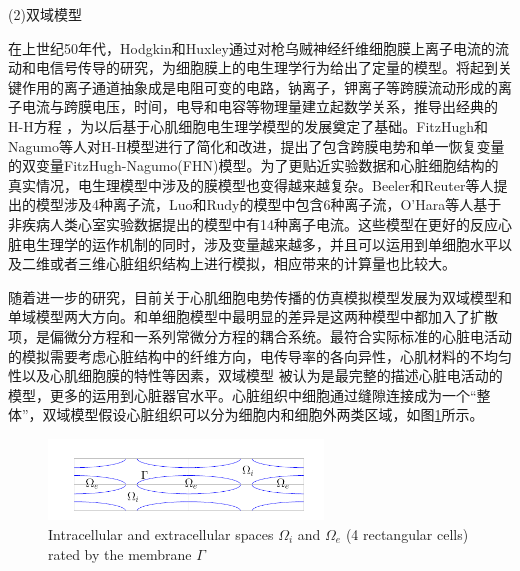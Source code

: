 \documentclass[twoside,UTF8]{nputhesis}
\begin{document}
(2)双域模型

在上世纪50年代，Hodgkin和Huxley通过对枪乌贼神经纤维细胞膜上离子电流的流动和电信号传导的研究，为细胞膜上的电生理学行为给出了定量的模型。将起到关键作用的离子通道抽象成是电阻可变的电路，钠离子，钾离子等跨膜流动形成的离子电流与跨膜电压，时间，电导和电容等物理量建立起数学关系，推导出经典的H-H方程
\cite{HH1952yu,HH1952,HH1952a,HH1952b}，为以后基于心肌细胞电生理学模型的发展奠定了基础。FitzHugh\cite{FitzHugh1961}和Nagumo\cite{Nagumo1962}等人对H-H模型进行了简化和改进，提出了包含跨膜电势和单一恢复变量的双变量FitzHugh-Nagumo(FHN)模型。为了更贴近实验数据和心脏细胞结构的真实情况，电生理模型中涉及的膜模型也变得越来越复杂。Beeler和Reuter等人\cite{Beer1977}提出的模型涉及4种离子流，Luo和Rudy\cite{Luo1991}的模型中包含6种离子流，O'Hara等人\cite{ORD2011}基于非疾病人类心室实验数据提出的模型中有14种离子电流。这些模型在更好的反应心脏电生理学的运作机制的同时，涉及变量越来越多，并且可以运用到单细胞水平以及二维或者三维心脏组织结构上进行模拟\cite{3D1,3D2,3D3}，相应带来的计算量也比较大。

随着进一步的研究，目前关于心肌细胞电势传播的仿真模拟模型发展为双域模型和单域模型两大方向。和单细胞模型中最明显的差异是这两种模型中都加入了扩散项，是偏微分方程和一系列常微分方程的耦合系统。最符合实际标准的心脏电活动的模拟需要考虑心脏结构中的纤维方向，电传导率的各向异性，心肌材料的不均匀性以及心肌细胞膜的特性等因素，双域模型\cite{bodo1983,EJ1,JS1} 被认为是最完整的描述心脏电活动的模型，更多的运用到心脏器官水平。心脏组织中细胞通过缝隙连接成为一个“整体”，双域模型假设心脏组织可以分为细胞内和细胞外两类区域，如图\ref{figbd}所示。
\begin{figure}[ht]
	\centering
	\includegraphics[width=0.65\textwidth,height=0.2\textwidth]{figures/ying.png}
	\hspace{0.04\textwidth}
	\caption{Intracellular and extracellular spaces $\Omega_i$ and $\Omega_e$ (4 rectangular cells) rated by the membrane $\Gamma$\cite{Ying2005}}
	\label{figbd} 
\end{figure}
\end{document}
